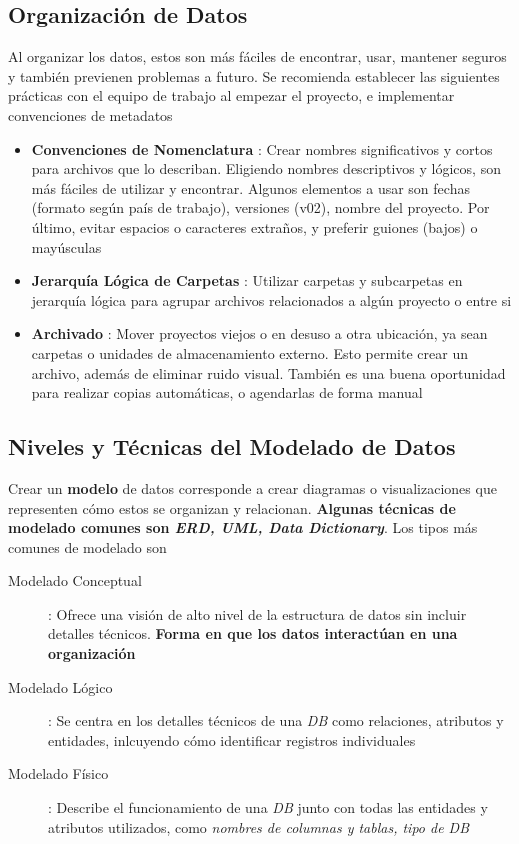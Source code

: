 \subsection{Organización de Datos}
Al organizar los datos, estos son más fáciles de encontrar, usar, mantener seguros y también previenen problemas a futuro. Se recomienda establecer las siguientes prácticas con el equipo de trabajo al empezar el proyecto, e implementar convenciones de metadatos
\begin{itemize}
    \item {\textbf{Convenciones de Nomenclatura} : Crear nombres significativos y cortos para archivos que lo describan. Eligiendo nombres descriptivos y lógicos, son más fáciles de utilizar y encontrar. Algunos elementos a usar son fechas (formato según país de trabajo), versiones (v02), nombre del proyecto. Por último, evitar espacios o caracteres extraños, y preferir guiones (bajos) o mayúsculas}
    \item {\textbf{Jerarquía Lógica de Carpetas} : Utilizar carpetas y subcarpetas en jerarquía lógica para agrupar archivos relacionados a algún proyecto o entre si}
    \item {\textbf{Archivado} : Mover proyectos viejos o en desuso a otra ubicación, ya sean carpetas o unidades de almacenamiento externo. Esto permite crear un archivo, además de eliminar ruido visual. También es una buena oportunidad para realizar copias automáticas, o agendarlas de forma manual}
\end{itemize}

\subsection{Niveles y Técnicas del Modelado de Datos}
Crear un \textbf{modelo} de datos corresponde a crear diagramas o visualizaciones que representen cómo estos se organizan y relacionan. \textbf{Algunas técnicas de modelado comunes son \textit{ERD, UML, Data Dictionary}}. Los tipos más comunes de modelado son 
\begin{description}
    \item[Modelado Conceptual]{ : Ofrece una visión de alto nivel de la estructura de datos sin incluir detalles técnicos. \textbf{Forma en que los datos interactúan en una organización}}
    \item[Modelado Lógico]{ : Se centra en los detalles técnicos de una \textit{DB} como relaciones, atributos y entidades, inlcuyendo cómo identificar registros individuales}
    \item[Modelado Físico]{ : Describe el funcionamiento de una \textit{DB} junto con todas las entidades y atributos utilizados, como \textit{ nombres de columnas y tablas, tipo de DB}} 
\end{description}

